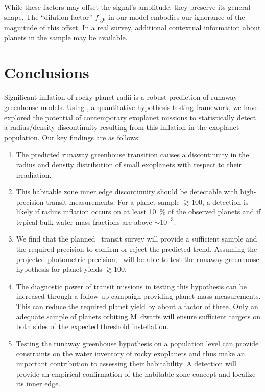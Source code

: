 \documentclass[twocolumn,twocolappendix]{aastex631}
\begin{document}
While these factors may offset the signal's amplitude, they preserve its general shape.
The ``dilution factor'' $f_\mathrm{rgh}$ in our model embodies our ignorance of the magnitude of this offset.
In a real survey, additional contextual information about planets in the sample may be available.


\section{Conclusions}\label{sec:conclusions}
Significant inflation of rocky planet radii is a robust prediction of runaway greenhouse models.
Using \bioverse, a quantitative hypothesis testing framework, we have explored the potential of contemporary exoplanet missions to statistically detect a radius/density discontinuity resulting from this inflation in the exoplanet population.
Our key findings are as follows:
\begin{enumerate}
    \item The predicted runaway greenhouse transition causes a discontinuity in the radius and density distribution of small exoplanets with respect to their irradiation.
    \item This habitable zone inner edge discontinuity should be detectable with high-precision transit measurements.
          For a planet sample $\gtrsim 100$, a detection is likely if radius inflation occurs on at least \SI{10}{\percent} of the observed planets and if typical bulk water mass fractions are above $\sim 10^{-3}$.
    \item We find that the planned \plato\ transit survey will provide a sufficient sample and the required precision to confirm or reject the predicted trend.
          Assuming the projected photometric precision, \plato\ will be able to test the runaway greenhouse hypothesis for planet yields $\gtrsim 100$.
    \item The diagnostic power of transit missions in testing this hypothesis can be increased through a follow-up campaign providing planet mass measurements.
          This can reduce the required planet yield by about a factor of three.
          Only an adequate sample of planets orbiting M~dwarfs will ensure sufficient targets on both sides of the expected threshold instellation.
    \item Testing the runaway greenhouse hypothesis on a population level can provide constraints on the water inventory of rocky exoplanets and thus make an important contribution to assessing their habitability.
         A detection will provide an empirical confirmation of the habitable zone concept and localize its inner edge.

\end{enumerate}
\end{document}
